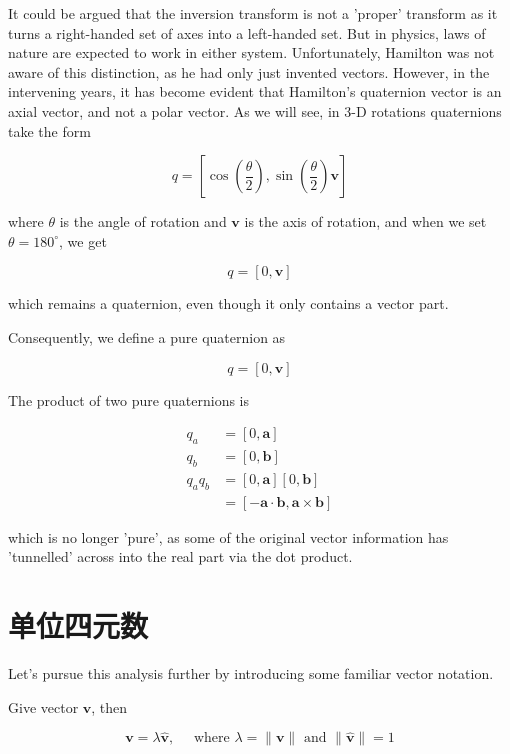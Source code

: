 It could be argued that the inversion transform is not a 'proper' transform as it turns a right-handed set of axes into a left-handed set. But in physics, laws of nature are expected to work in either system. Unfortunately, Hamilton was not aware of this distinction, as he had only just invented vectors. However, in the intervening years, it has become evident that Hamilton's quaternion vector is an axial vector, and not a polar vector. As we will see, in 3-D rotations quaternions take the form

$$
    q=\left[\cos \left(\frac{\theta}{2}\right), \sin \left(\frac{\theta}{2}\right) \mathbf{v}\right]
$$

where $\theta$ is the angle of rotation and $\mathbf{v}$ is the axis of rotation, and when we set $\theta=180^{\circ}$, we get

$$
    q=[0, \mathbf{v}]
$$

which remains a quaternion, even though it only contains a vector part.

Consequently, we define a pure quaternion as

$$
    q=[0, \mathbf{v}]
$$

The product of two pure quaternions is

$$
    \begin{aligned}
        q_{a}       & =[0, \mathbf{a}]                                              \\
        q_{b}       & =[0, \mathbf{b}]                                              \\
        q_{a} q_{b} & =[0, \mathbf{a}][0, \mathbf{b}]                               \\
                    & =[-\mathbf{a} \cdot \mathbf{b}, \mathbf{a} \times \mathbf{b}]
    \end{aligned}
$$

which is no longer 'pure', as some of the original vector information has 'tunnelled' across into the real part via the dot product.

\section{单位四元数}
Let's pursue this analysis further by introducing some familiar vector notation.

Give vector $\mathbf{v}$, then

$$
    \mathbf{v}=\lambda \hat{\mathbf{v}}, \quad \text { where } \lambda=\|\mathbf{v}\| \text { and }\|\hat{\mathbf{v}}\|=1
$$

